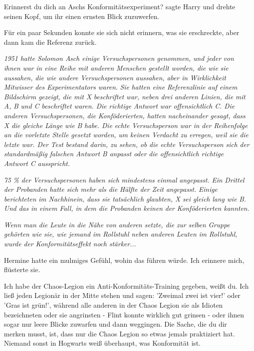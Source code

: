 \glqq Erinnerst du dich an Aschs Konformitätsexperiment?\grqq{} sagte Harry und
drehte seinen Kopf, um ihr einen ernsten Blick zuzuwerfen.

Für ein paar Sekunden konnte sie sich nicht erinnern, was sie erschreckte, aber
dann kam die Referenz zurück.

\emph{1951 hatte Solomon Asch einige Versuchspersonen genommen, und jeder von ihnen war in eine Reihe mit anderen Menschen gestellt worden, die wie sie aussahen, die wie andere Versuchspersonen aussahen, aber in Wirklichkeit Mitwisser des Experimentators waren. }
\emph{Sie hatten eine Referenzlinie auf einem Bildschirm gezeigt, die mit X
beschriftet war, neben drei anderen Linien, die mit A, B und C beschriftet
waren. Die richtige Antwort war offensichtlich C. Die anderen \glqq
Versuchspersonen\grqq{}, die Konföderierten, hatten nacheinander gesagt, dass X
die gleiche Länge wie B habe. Die echte Versuchsperson war in der Reihenfolge an
die vorletzte Stelle gesetzt worden, um keinen Verdacht zu erregen, weil sie die
letzte war. Der Test bestand darin, zu sehen, ob die echte Versuchsperson sich
der standardmäßig falschen Antwort B \glqq anpasst\grqq{} oder die
offensichtlich richtige Antwort C ausspricht. }

\emph{75 \% der Versuchspersonen haben sich mindestens einmal \glqq
angepasst\grqq{}. }
\emph{Ein Drittel der Probanden hatte sich mehr als die Hälfte der Zeit angepasst. }
\emph{Einige berichteten im Nachhinein, dass sie tatsächlich glaubten, X sei gleich lang wie B. Und das in einem Fall, in dem die Probanden keinen der Konföderierten kannten. }

\emph{Wenn man die Leute in die Nähe von anderen setzte, die zur selben Gruppe gehörten wie sie, wie jemand im Rollstuhl neben anderen Leuten im Rollstuhl, wurde der Konformitätseffekt noch stärker... }

Hermine hatte ein mulmiges Gefühl, wohin das führen würde. \glqq Ich erinnere
mich\grqq{}, flüsterte sie.

\glqq Ich habe der Chaos-Legion ein Anti-Konformitäts-Training gegeben, weißt
du. Ich ließ jeden Legionär in der Mitte stehen und sagen: 'Zweimal zwei ist
vier!' oder 'Gras ist grün!', während alle anderen in der Chaos Legion sie als
Idioten bezeichneten oder sie angrinsten - Flint konnte wirklich gut grinsen -
oder ihnen sogar nur leere Blicke zuwarfen und dann weggingen. Die Sache, die du
dir merken musst, ist, dass nur die Chaos Legion so etwas jemals praktiziert
hat. Niemand sonst in Hogwarts weiß überhaupt, was Konformität ist.\grqq{}

